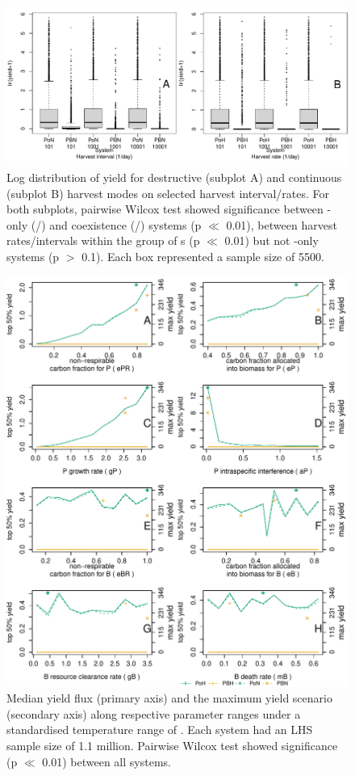 \documentclass[../thesis.tex]{subfiles} %
\begin{document}
\begin{figure}[H]
    \centering
    \includegraphics[width=\linewidth]{result/Harvest.pdf}
    \caption[Yield flux distribution by harvest mode]{Log distribution of yield for destructive (subplot A) and continuous (subplot B) harvest modes on selected harvest interval/rates.  For both subplots, pairwise Wilcox test showed significance between \phy-only (\PoH/\PoN) and coexistence (\PBH/\PBN) systems (p $\ll$ 0.01), between harvest rates/intervals within the group of \pbs s (p $\ll$ 0.01) but not \phy-only systems (p $>$ 0.1).  Each box represented a sample size of 5500.}
    \label{f:ydByHarv}
\end{figure}

\begin{figure}[H]
    \centering
    \includegraphics[width=\linewidth]{result/yieldFlux.pdf}
    \caption[Yield flux median in biological parameter space]{Median yield flux (primary axis) and the maximum yield scenario (secondary axis) along respective parameter ranges under a standardised temperature range of \temp.  Each system had an LHS sample size of 1.1 million.  Pairwise Wilcox test showed significance (p $\ll$ 0.01) between all systems.}
    \label{f:ydByPara}
\end{figure}
\end{document}

